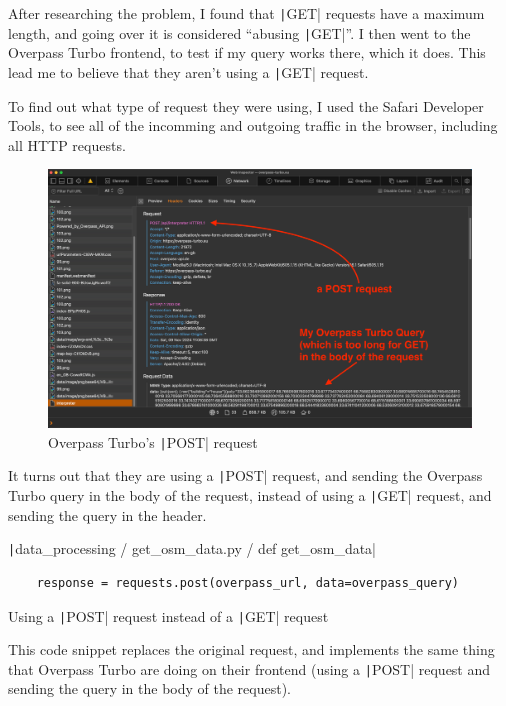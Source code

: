\documentclass[12pt]{report}
\newcommand{\pil}[1]{\protect\texttt|#1|}
\begin{document}
After researching the problem, I found that \pil{GET} requests have a maximum length, and going over it is considered ``abusing \pil{GET}''. I then went to the Overpass Turbo frontend, to test if my query works there, which it does. This lead me to believe that they aren't using a \pil{GET} request.

To find out what type of request they were using, I used the Safari Developer Tools, to see all of the incomming and outgoing traffic in the browser, including all HTTP requests.

\begin{figure}[H]
\centering
\includegraphics[width=14cm]{ss5.6.png}
\caption{Overpass Turbo's \pil{POST} request}\label{fig:ss5.6}
\end{figure}

It turns out that they are using a \pil{POST} request, and sending the Overpass Turbo query in the body of the request, instead of using a \pil{GET} request, and sending the query in the header.

\begin{listing}[H]
\pil{data_processing / get_osm_data.py / def get_osm_data}
\begin{verbatim}
    response = requests.post(overpass_url, data=overpass_query)
\end{verbatim}
\caption{Using a \pil{POST} request instead of a \pil{GET} request}\label{cs:postRequest}
\end{listing}

This code snippet replaces the original request, and implements the same thing that Overpass Turbo are doing on their frontend (using a \pil{POST} request and sending the query in the body of the request).
\end{document}
